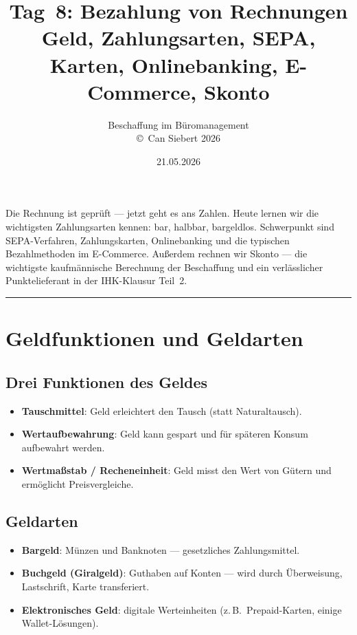 \documentclass[11pt, a4paper]{article}
\title{\vspace*{-1.5cm}\Huge\bfseries\color{bfwPrimaryDark}Tag~8: Bezahlung von Rechnungen\\[0.4em]
  \large\color{bfwInkSoft}\textnormal{Geld, Zahlungsarten, SEPA, Karten, Onlinebanking, E-Commerce, Skonto}}
\author{\textsf{Beschaffung im Büromanagement}\\
\textsf{\small\copyright\ Can Siebert\,\textperiodcentered\,2026}}
\date{21.05.2026}
\begin{document}
\maketitle
\thispagestyle{empty}

\vspace{1em}
\begin{merksatz}[title={\bfseries Worum geht es heute?}]
Die Rechnung ist geprüft --- jetzt geht es ans Zahlen. Heute lernen wir die wichtigsten
Zahlungsarten kennen: bar, halbbar, bargeldlos. Schwerpunkt sind SEPA-Verfahren,
Zahlungskarten, Onlinebanking und die typischen Bezahlmethoden im E-Commerce.
Außerdem rechnen wir Skonto --- die wichtigste kaufmännische Berechnung der
Beschaffung und ein verlässlicher Punktelieferant in der IHK-Klausur Teil~2.
\end{merksatz}

\tableofcontents
\vspace{1em}
\hrule
\vspace{1em}

\section{Geldfunktionen und Geldarten}

\subsection{Drei Funktionen des Geldes}

\begin{itemize}[itemsep=2pt]
  \item \textbf{Tauschmittel}: Geld erleichtert den Tausch (statt Naturaltausch).
  \item \textbf{Wertaufbewahrung}: Geld kann gespart und für späteren Konsum aufbewahrt werden.
  \item \textbf{Wertmaßstab / Recheneinheit}: Geld misst den Wert von Gütern und ermöglicht Preisvergleiche.
\end{itemize}

\subsection{Geldarten}

\begin{itemize}[itemsep=2pt]
  \item \textbf{Bargeld}: Münzen und Banknoten --- gesetzliches Zahlungsmittel.
  \item \textbf{Buchgeld (Giralgeld)}: Guthaben auf Konten --- wird durch Überweisung, Lastschrift, Karte transferiert.
  \item \textbf{Elektronisches Geld}: digitale Werteinheiten (z.\,B.\ Prepaid-Karten, einige Wallet-Lösungen).
\end{itemize}
\end{document}
